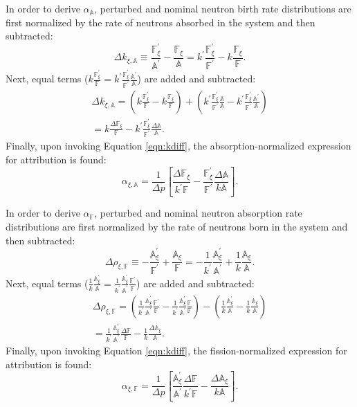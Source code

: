 \documentclass[11pt]{article}
\newcommand{\A}[0]{\mathbb{A}}
\newcommand{\F}[0]{\mathbb{F}}
\begin{document}
In order to derive $\alpha_\A$, perturbed and nominal neutron birth rate distributions are first normalized by the rate of neutrons absorbed in the system and then subtracted:
\begin{equation}
    \Delta k_{\xi,\A} \equiv \frac{\F_\xi^\prime}{\A^\prime} - \frac{\F_\xi}{\A} = k^\prime \frac{\F_\xi^\prime}{\F^\prime} - k \frac{\F_\xi}{\F}.
\end{equation}
Next, equal terms ($k \frac{\F_\xi^\prime}{\F} = k^\prime \frac{\F_\xi^\prime}{\F^\prime} \frac{\A^\prime}{\A}$) are added and subtracted:
\begin{equation}
    \begin{split}
        \Delta k_{\xi,\A}=\left(k \frac{\F_\xi^\prime}{\F} - k \frac{\F_\xi}{\F}\right) + \left(k^\prime \frac{\F_\xi^\prime}{\F^\prime}\frac{\A}{\A} - k^\prime \frac{\F_\xi^\prime}{\F^\prime}\frac{\A^\prime}{\A}\right) \\
        = k \frac{\Delta\F_\xi}{\F} - k^\prime \frac{\F_\xi^\prime}{\F^\prime}\frac{\Delta\A}{\A}.
    \end{split}
\end{equation}
Finally, upon invoking Equation \ref{eqn:kdiff}, the absorption-normalized expression for attribution is found:
\begin{equation}
    \alpha_{\xi,\A} = \frac{1}{\Delta p} \left[\frac{\Delta\F_\xi}{k^\prime \F} - \frac{\F_\xi^\prime}{\F^\prime} \frac{\Delta\A}{k\A}\right].
    \label{eqn:alphaA}
\end{equation}

In order to derive $\alpha_\F$, perturbed and nominal neutron absorption rate distributions are first normalized by the rate of neutrons born in the system and then subtracted:
\begin{equation}
    \Delta \rho_{\xi,\F} \equiv -\frac{\A_\xi^\prime}{\F^\prime} + \frac{\A_\xi}{\F} = -\frac{1}{k^\prime}\frac{\A_\xi^\prime}{\A^\prime} + \frac{1}{k}\frac{\A_\xi}{\A}.
\end{equation}
Next, equal terms ($\frac{1}{k} \frac{\A_\xi^\prime}{\A} = \frac{1}{k^\prime}\frac{\A_\xi^\prime}{\A^\prime}\frac{\F^\prime}{\F}$) are added and subtracted:
\begin{equation}
    \begin{split}
        \Delta \rho_{\xi,\F} = \left(\frac{1}{k^\prime}\frac{\A_\xi^\prime}{\A^\prime}\frac{\F^\prime}{\F} - \frac{1}{k^\prime}\frac{\A_\xi^\prime}{\A^\prime}\frac{\F}{\F}\right) - \left(\frac{1}{k}\frac{\A_\xi^\prime}{\A} - \frac{1}{k}\frac{\A_\xi}{\A}\right) \\
        = \frac{1}{k^\prime}\frac{\A_\xi^\prime}{\A^\prime}\frac{\Delta\F}{\F} - \frac{1}{k}\frac{\Delta\A_\xi}{\A}.
    \end{split}
\end{equation}
Finally, upon invoking Equation \ref{eqn:kdiff}, the fission-normalized expression for attribution is found:
\begin{equation}
    \alpha_{\xi,\F} = \frac{1}{\Delta p}\left[\frac{\A_\xi^\prime}{\A^\prime}\frac{\Delta\F}{k^\prime \F} - \frac{\Delta\A_\xi}{k\A}\right].
    \label{eqn:alphaF}
\end{equation}
\end{document}

